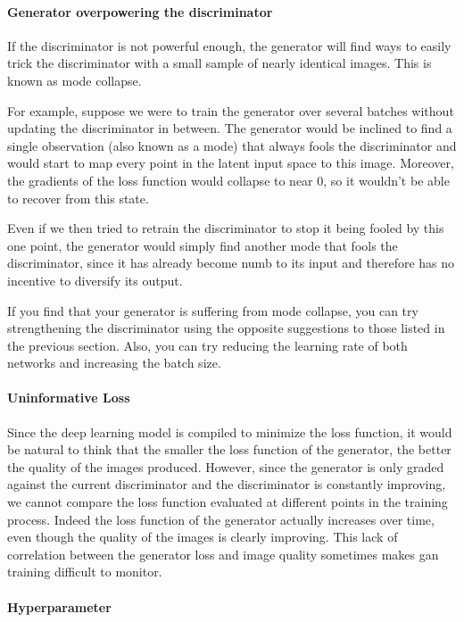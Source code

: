 \paragraph{Generator overpowering the discriminator}

If the discriminator is not powerful enough, the generator will find ways to easily trick the discriminator with a small sample of nearly identical images.
This is known as mode collapse.

For example, suppose we were to train the generator over several batches without updating the discriminator in between.
The generator would be inclined to find a single observation (also known as a mode) that always fools the discriminator and would start to map every point in the latent input space to this image.
Moreover, the gradients of the loss function would collapse to near 0, so it wouldn’t be able to recover from this state.

Even if we then tried to retrain the discriminator to stop it being fooled by this one point, the generator would simply find another mode that fools the discriminator, since it has already become numb to its input and therefore has no incentive to diversify its output.

If you find that your generator is suffering from mode collapse, you can try strengthening the discriminator using the opposite suggestions to those listed in the previous section.
Also, you can try reducing the learning rate of both networks and increasing the batch size.

\paragraph{Uninformative Loss}

Since the deep learning model is compiled to minimize the loss function, it would be natural to think that the smaller the loss function of the generator, the better the quality of the images produced.
However, since the generator is only graded against the current discriminator and the discriminator is constantly improving, we cannot compare the loss function evaluated at different points in the training process.
Indeed the loss function of the generator actually increases over time, even though the quality of the images is clearly improving.
This lack of correlation between the generator loss and image quality sometimes makes \gls{gan} training difficult to monitor.

\paragraph{Hyperparameter}

